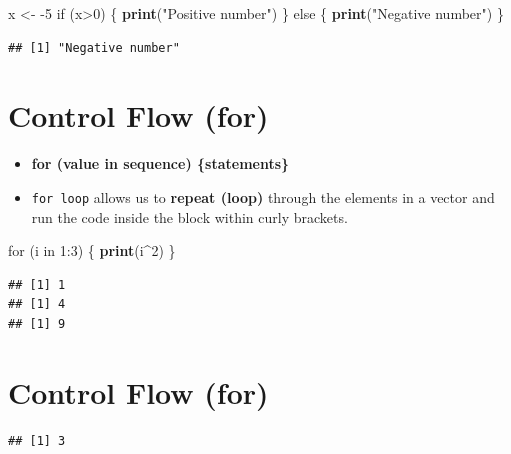 \documentclass[]{book}
\newenvironment{Shaded}{\begin{snugshade}}{\end{snugshade}}
\newcommand{\KeywordTok}[1]{\textcolor[rgb]{0.13,0.29,0.53}{\textbf{{#1}}}}
\newcommand{\DecValTok}[1]{\textcolor[rgb]{0.00,0.00,0.81}{{#1}}}
\newcommand{\StringTok}[1]{\textcolor[rgb]{0.31,0.60,0.02}{{#1}}}
\newcommand{\CommentTok}[1]{\textcolor[rgb]{0.56,0.35,0.01}{\textit{{#1}}}}
\newcommand{\NormalTok}[1]{{#1}}
\providecommand{\tightlist}{%
  \setlength{\itemsep}{0pt}\setlength{\parskip}{0pt}}
\begin{document}
\begin{Shaded}
\begin{Highlighting}[]
\NormalTok{x <-}\StringTok{ }\NormalTok{-}\DecValTok{5}
\NormalTok{if (x>}\DecValTok{0}\NormalTok{) \{}
  \KeywordTok{print}\NormalTok{(}\StringTok{"Positive number"}\NormalTok{)}
\NormalTok{\} else \{}
  \KeywordTok{print}\NormalTok{(}\StringTok{"Negative number"}\NormalTok{)}
\NormalTok{\}}
\end{Highlighting}
\end{Shaded}

\begin{verbatim}
## [1] "Negative number"
\end{verbatim}

\section{Control Flow (for)}\label{control-flow-for}

\begin{itemize}
\tightlist
\item
  \textbf{for (value in sequence) \{statements\}}
\item
  \texttt{for\ loop} allows us to \textbf{repeat (loop)} through the
  elements in a vector and run the code inside the block within curly
  brackets.
\end{itemize}

\begin{Shaded}
\begin{Highlighting}[]
\NormalTok{for (i in }\DecValTok{1}\NormalTok{:}\DecValTok{3}\NormalTok{) \{}
  \KeywordTok{print}\NormalTok{(i^}\DecValTok{2}\NormalTok{)}
\NormalTok{\}}
\end{Highlighting}
\end{Shaded}

\begin{verbatim}
## [1] 1
## [1] 4
## [1] 9
\end{verbatim}

\section{Control Flow (for)}\label{control-flow-for-1}

\begin{Shaded}
\end{Shaded}

\begin{verbatim}
## [1] 3
\end{verbatim}


\end{document}
